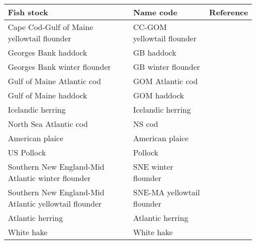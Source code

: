 \begin{tabular}{lll}
\toprule
Fish stock & Name code & Reference\\
\midrule
Cape Cod-Gulf of Maine yellowtail flounder & CC-GOM yellowtail flounder & \\
Georges Bank haddock & GB haddock & \\
Georges Bank winter flounder & GB winter flounder & \\
Gulf of Maine Atlantic cod & GOM Atlantic cod & \\
Gulf of Maine haddock & GOM haddock & \\
Icelandic herring & Icelandic herring & \\
North Sea Atlantic cod & NS cod & \\
American plaice & American plaice & \\
US Pollock & Pollock & \\
Southern New England-Mid Atlantic winter flounder & SNE winter flounder & \\
Southern New England-Mid Atlantic yellowtail flounder & SNE-MA yellowtail flounder & \\
Atlantic herring & Atlantic herring & \\
White hake & White hake & \\
\bottomrule
\end{tabular}
